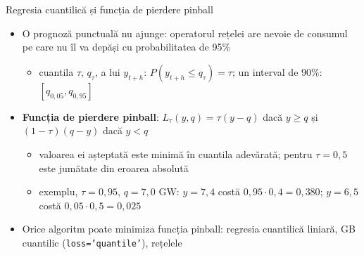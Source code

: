 \begin{frame}{Regresia cuantilică și funcția de pierdere pinball}
\itemsize{\footnotesize}
\begin{itemize}
    \item O prognoză punctuală nu ajunge: operatorul rețelei are nevoie de consumul pe care nu îl va depăși cu probabilitatea de 95\%
    \begin{itemize}
        \item cuantila $\tau$, $q_\tau$, a lui $y_{t+h}$: $P(y_{t+h} \le q_\tau) = \tau$; un interval de 90\%: $[q_{0{,}05}, q_{0{,}95}]$
    \end{itemize}
    \item \textbf{Funcția de pierdere pinball}: $L_\tau(y, q) = \tau(y - q)$ dacă $y \ge q$ și $(1 - \tau)(q - y)$ dacă $y < q$ 
    \begin{itemize}
        \item valoarea ei așteptată este minimă în cuantila adevărată; pentru $\tau = 0{,}5$ este jumătate din eroarea absolută
        \item exemplu, $\tau = 0{,}95$, $q = 7{,}0$ GW: $y = 7{,}4$ costă $0{,}95 \cdot 0{,}4 = 0{,}380$; $y = 6{,}5$ costă $0{,}05 \cdot 0{,}5 = 0{,}025$
    \end{itemize}
    \item Orice algoritm poate minimiza funcția pinball: regresia cuantilică liniară, GB cuantilic (\texttt{loss='quantile'}), rețelele
\end{itemize}
\end{frame}

